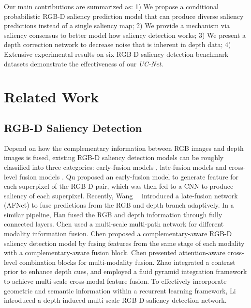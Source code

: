 \documentclass[10pt,twocolumn,letterpaper]{article}
\def\ourmodel{\textit{UC-Net}}
\begin{document}
Our main contributions are summarized as: 1) We propose a conditional probabilistic RGB-D saliency prediction model that can produce diverse saliency predictions instead of a single saliency map;
2) We provide a mechanism via saliency consensus to better model how saliency detection works; 3) We present a depth correction network to decrease noise that is inherent in depth data; 4) Extensive experimental results on six RGB-D saliency detection benchmark  datasets demonstrate the effectiveness of our \ourmodel.





\section{Related Work}











\subsection{RGB-D Saliency Detection}
Depend on how the complementary information between RGB images and depth images is fused, existing RGB-D saliency detection models can be roughly classified into three categories: early-fusion models \cite{qu2017rgbd}, late-fusion models \cite{wang2019adaptive,han2017cnns} and cross-level fusion models \cite{dmra_iccv19,chen2018progressively,chen2019multi,chen2019three,zhao2019Contrast}. 
Qu \etal \cite{qu2017rgbd} proposed an early-fusion model to generate feature for each superpixel of the RGB-D pair, which was then fed to a CNN to produce saliency of each superpixel. Recently, Wang~\etal~\cite{wang2019adaptive} introduced a late-fusion network (\ie AFNet) to fuse predictions from the RGB and depth branch adaptively. In a similar pipeline, Han \etal \cite{han2017cnns} fused the RGB and depth information through fully connected layers.
Chen \etal \cite{chen2019multi} used a multi-scale multi-path network for different modality information fusion. Chen \etal \cite{chen2018progressively} proposed a complementary-aware RGB-D saliency detection model by fusing features from the same stage of each modality with a complementary-aware fusion block.
Chen \etal \cite{chen2019three} presented attention-aware cross-level combination blocks for multi-modality fusion.
Zhao \etal \cite{zhao2019Contrast} integrated a contrast prior to enhance depth cues, and employed a fluid pyramid integration framework to achieve multi-scale cross-modal feature fusion.
To effectively incorporate geometric and semantic information within a recurrent learning framework, Li \etal~\cite{dmra_iccv19} introduced a depth-induced multi-scale RGB-D saliency detection network.
\end{document}
